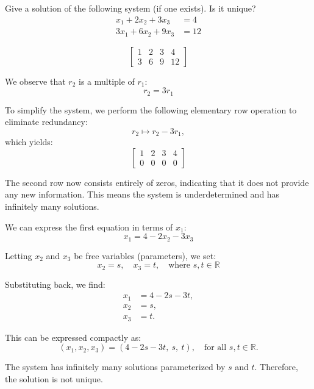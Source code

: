 \begin{example}
    Give a solution of the following system (if one exists). Is it unique?
    \[
        \begin{aligned}
        x_1+2 x_2+3 x_3 & =4 \\
        3 x_1+6 x_2+9 x_3 & =12
        \end{aligned}
    \]
\end{example}

\begin{solution}
        \[
        \left[\begin{array}{cccc}
        1 & 2 & 3 & 4 \\
        3 & 6 & 9 & 12
        \end{array}\right]
        \]
        
        We observe that $r_2$ is a multiple of $r_1$:
        \[
        r_2 = 3r_1
        \]
        
        To simplify the system, we perform the following elementary row operation to eliminate redundancy:
        \[
        r_2 \mapsto r_2 - 3r_1,
        \]
        which yields:
        \[
        \left[\begin{array}{cccc}
        1 & 2 & 3 & 4 \\
        0 & 0 & 0 & 0
        \end{array}\right]
        \]
        
        The second row now consists entirely of zeros, indicating that it does not provide any new information. This means the system is underdetermined and has infinitely many solutions.
        
        We can express the first equation in terms of $x_1$:
        \[
        x_1 = 4 - 2x_2 - 3x_3
        \]
        
        Letting $x_2$ and $x_3$ be free variables (parameters), we set:
        \[
        x_2 = s, \quad x_3 = t, \quad \text{where } s, t \in \mathbb{R}
        \]
        
        Substituting back, we find:
        \[
        \begin{aligned}
        x_1 &= 4 - 2s - 3t, \\
        x_2 &= s, \\
        x_3 &= t.
        \end{aligned}
        \]
        
        This can be expressed compactly as:
        \[
        (x_1, x_2, x_3) = (4 - 2s - 3t, \ s, \ t), \quad \text{for all } s, t \in \mathbb{R}.
        \]
        
        The system has infinitely many solutions parameterized by $s$ and $t$. Therefore, the solution is not unique.\end{solution}

